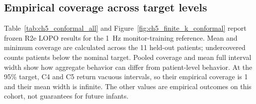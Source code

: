 \subsection{Empirical coverage across target levels}

Table~\ref{tab:ch5_conformal_all} and Figure~\ref{fig:ch5_finite_k_conformal} report frozen R2e LOPO results for the 1~Hz monitor-training reference. Mean and minimum coverage are calculated across the 11 held-out patients; undercovered counts patients below the nominal target. Pooled coverage and mean full interval width show how aggregate behavior can differ from patient-level behavior. At the 95\% target, C4 and C5 return vacuous intervals, so their empirical coverage is 1 and their mean width is infinite. The other values are empirical outcomes on this cohort, not guarantees for future infants.

